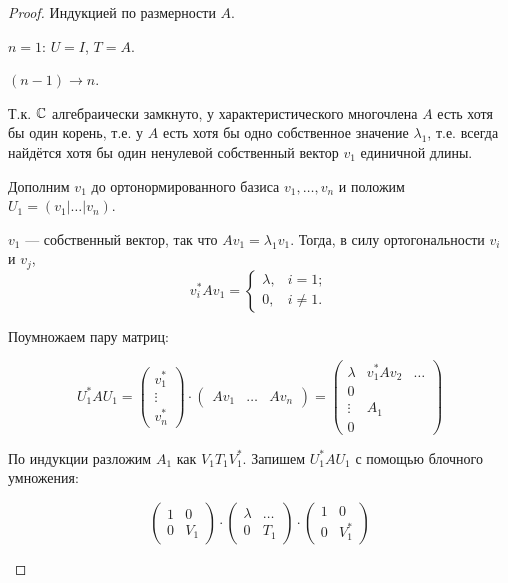 \begin{proof} Индукцией по размерности $A$.
    \begin{base} $n = 1$: $U = I$, $T = A$. \end{base}
    \begin{induct}
        $(n - 1) \to n$.

        Т.к. $\mathbb{C}$ алгебраически замкнуто, у характеристического многочлена $A$
        есть хотя бы один корень, т.е. у $A$ есть хотя бы одно собственное
        значение $\lambda_1$, т.е. всегда найдётся хотя бы один ненулевой
        собственный вектор $v_1$ единичной длины.

        Дополним $v_1$ до ортонормированного базиса $v_1, \dots , v_n$ и положим
        $U_1 = ( v_1 | \dots | v_n )$.

        $v_1$ --- собственный вектор, так что $A v_1 = \lambda_1 v_1$. Тогда, в
        силу ортогональности $v_i$ и $v_j$,
        \[
            v_i^* A v_1 = \begin{cases}
                \lambda, & i = 1; \\
                0, & i \ne 1.
            \end{cases}
        \]

        Поумножаем пару
        матриц:

        \[
            U_1^* A U_1 = \begin{pmatrix} v_1^* \\ \vdots \\ v_n^* \end{pmatrix}
            \cdot \begin{pmatrix} A v_1 & \dots & A v_n \end{pmatrix}
            = \begin{pmatrix}
                \lambda & v_1^* A v_2 & \dots \\
                0 \\
                \vdots & A_1 \\
                0
            \end{pmatrix}
        \]

        По индукции разложим $A_1$ как $V_1 T_1 V_1^*$. Запишем $U_1^* A U_1$ с
        помощью блочного умножения:

        \[
            \begin{pmatrix} 1 & 0 \\ 0 & V_1 \end{pmatrix}
            \cdot \begin{pmatrix} \lambda & \dots \\ 0 & T_1 \end{pmatrix}
            \cdot \begin{pmatrix} 1 & 0 \\ 0 & V_1^* \end{pmatrix}
        \]


\end{induct}
\end{proof}

